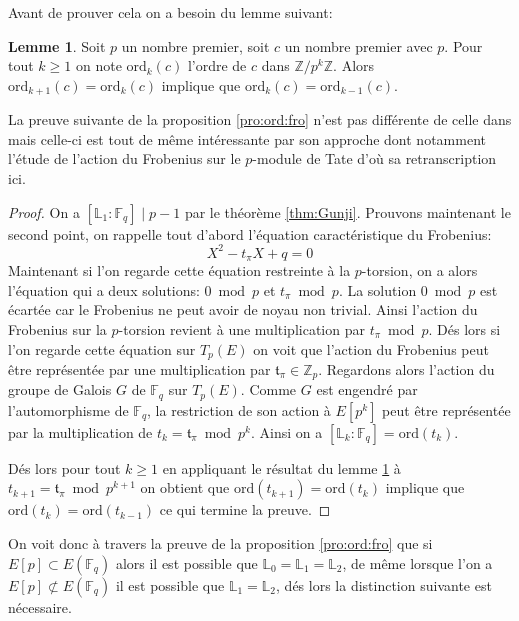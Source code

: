 \documentclass[10pt,a4paper]{book}
\theoremstyle{plain}
\theoremstyle{definition}
\newtheorem{lem}[thm]{Lemme}
\theoremstyle{definition}
\theoremstyle{definition}
\theoremstyle{definition}
\theoremstyle{remark}
\theoremstyle{remark}
\theoremstyle{definition}
\begin{document}
Avant de prouver cela on a besoin du lemme suivant:

\begin{lem}
\label{lem:ord}
Soit $p$ un nombre premier, soit $c$ un nombre premier avec $p$. Pour tout $k \geqslant 1$ on note $\mathrm{ord}_k(c)$ l'ordre de $c$ dans $\mathbb{Z}/p^k\mathbb{Z}$. Alors $\mathrm{ord}_{k+1}(c)=\mathrm{ord}_k(c)$ implique que $\mathrm{ord}_k(c) = \mathrm{ord}_{k-1}(c)$.
\end{lem}

La preuve suivante de la proposition \ref{pro:ord:fro} n'est pas différente de celle dans \cite[Proposition 5]{DeFeo11} mais celle-ci est tout de même intéressante par son approche dont notamment l'étude de l'action du Frobenius sur le $p$-module de Tate d'où sa retranscription ici.

\begin{proof}
On a $[\mathbb{L}_1:\mathbb{F}_q] \mid p-1$ par le théorème \ref{thm:Gunji}. Prouvons maintenant le second point,
on rappelle tout d'abord l'équation caractéristique du Frobenius:
\begin{equation}
X^2 - t_{\pi}X + q = 0
\end{equation}
Maintenant si l'on regarde cette équation restreinte à la $p$-torsion, on a alors l'équation qui a deux solutions: $0 \bmod p$ et $t_{\pi} \bmod p$. La solution $0 \bmod p$ est écartée car le Frobenius ne peut avoir de noyau non trivial. Ainsi l'action du Frobenius sur la $p$-torsion revient à une multiplication par $t_{\pi} \bmod p$. Dés lors si l'on regarde cette équation sur $T_{p}(E)$ on voit que l'action du Frobenius peut être représentée par une multiplication par $\mathfrak{t}_{\pi} \in \mathbb{Z}_{p} $. 
Regardons alors l'action du groupe de Galois $G$ de $\mathbb{F}_q$ sur $T_{p}(E)$. Comme $G$ est engendré par l'automorphisme de $\mathbb{F}_q$, la restriction de son action à $E[p^k]$ peut être représentée par la multiplication de $t_k=\mathfrak{t}_{\pi} \bmod p^k$. Ainsi on a $[\mathbb{L}_k:\mathbb{F}_q]=\mathrm{ord}(t_k)$.

Dés lors pour tout $k\geqslant 1$ en appliquant le résultat du lemme \ref{lem:ord} à $t_{k+1}=\mathfrak{t}_{\pi} \bmod p^{k+1}$ on obtient que $\mathrm{ord}(t_{k+1})=\mathrm{ord}(t_{k})$ implique que $\mathrm{ord}(t_{k})=\mathrm{ord}(t_{k-1})$ ce qui termine la preuve.
\end{proof}

On voit donc à travers la preuve de la proposition \ref{pro:ord:fro} que si $E[p] \subset E(\mathbb{F}_q)$ alors il est possible que $\mathbb{L}_0=\mathbb{L}_1=\mathbb{L}_2$, de même lorsque l'on a $E[p] \not\subset E(\mathbb{F}_q)$ il est possible que $\mathbb{L}_1=\mathbb{L}_2$, dés lors la distinction suivante est nécessaire.
\end{document}

